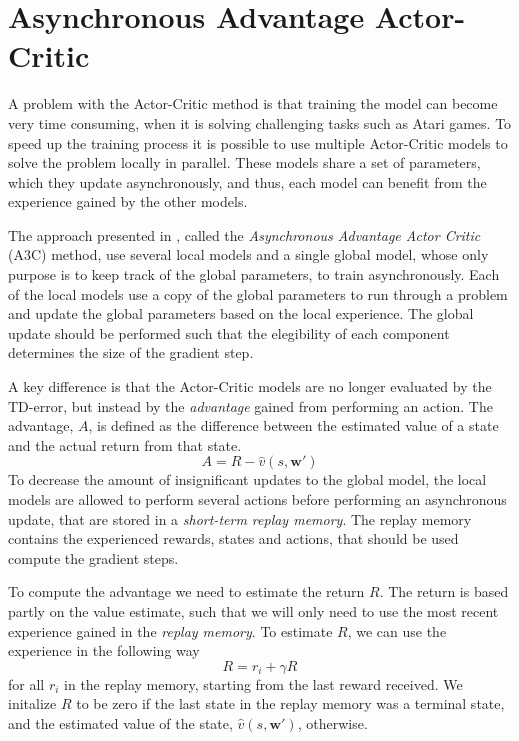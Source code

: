 \documentclass[11pt]{article}
\begin{document}

\section{Asynchronous Advantage Actor-Critic}\label{sec:a3c}

A problem with the Actor-Critic method is that training the model can become very time consuming,
when it is solving challenging tasks such as Atari games.
To speed up the training process it is possible to use 
multiple Actor-Critic models to 
solve the problem locally in parallel.
These models share a set of parameters, which they update asynchronously,
and thus, each model can benefit from the experience gained by the other models.

The approach presented in \cite{a3c}, called the \textit{Asynchronous Advantage Actor Critic} (A3C) method,
use several local models and a single global model, whose only purpose is to keep track of the global parameters,
to train asynchronously.
Each of the local models use a copy of the global parameters to run through a problem
and update the global parameters based on the local experience.
The global update should be performed such that
the elegibility of each component determines the size of the
gradient step.

A key difference is that the Actor-Critic models are no longer evaluated by the TD-error,
but instead by the \textit{advantage} gained from performing an action.
The advantage, $A$, is defined as the difference between the estimated value of
a state and the actual return from that state.
\begin{equation}
    A = R - \hat{v}(s, \mathbf{w}')
\end{equation}
To decrease the amount of insignificant updates to the global
model, the local models are allowed to perform several actions
before performing an asynchronous update, that are stored in a \textit{short-term
replay memory}.
The replay memory contains the experienced rewards, states and actions,
that should be used compute the gradient steps.

To compute the advantage we need to estimate the return $R$.
The return is based partly on the value estimate, such that we will only
need to use the most recent experience gained in the \textit{replay memory}.
To estimate $R$, we can use the experience in the following way
\begin{equation}
    R = r_i + \gamma R
\end{equation}
for all $r_i$ in the replay memory, starting from the last reward received.
We initalize $R$ to be zero if the last state in the replay memory was a terminal state,
and the estimated value of the state, $\hat{v}(s, \mathbf{w}')$, otherwise.
\end{document}

